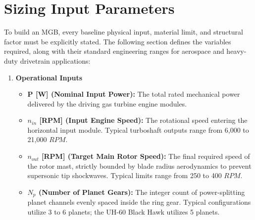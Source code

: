 \section{Sizing Input Parameters}
    To build an MGB, every baseline physical input, material limit, and structural factor must 
    be explicitly stated. The following section defines the variables required, along with their 
    standard engineering ranges for aerospace and heavy-duty drivetrain applications:
    	\begin{enumerate}
			\item \textbf{Operational Inputs}\par
                \begin{itemize}
                    \item \textbf{P [W] (Nominal Input Power):} The total rated mechanical power delivered by the driving gas turbine engine modules.
                    \item \textbf{$n_{in}$ [RPM] (Input Engine Speed):} The rotational speed entering the horizontal input module. Typical turboshaft outputs range from 6,000 to 21,000 $RPM$.
                    \item \textbf{$n_{out}$ [RPM] (Target Main Rotor Speed):} The final required speed of the rotor mast, strictly bounded by blade radius aerodynamics to prevent supersonic tip shockwaves. Typical limits range from 250 to 400 $RPM$.
                    \item \textbf{$N_{p}$ (Number of Planet Gears):} The integer count of power-splitting planet channels evenly spaced inside the ring gear. Typical configurations utilize 3 to 6 planets; the UH-60 Black Hawk utilizes 5 planets.
                \end{itemize}


\end{enumerate}
